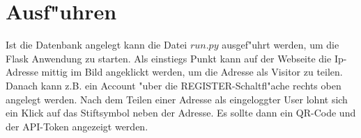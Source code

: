 \section{Ausf{"u}hren}\label{sec:ausfuhren}
Ist die Datenbank angelegt kann die Datei $run.py$ ausgef{"u}hrt werden, um die Flask Anwendung zu starten.
Als einstiegs Punkt kann auf der Webseite die Ip-Adresse mittig im Bild angeklickt werden, um die Adresse als Visitor zu teilen.
Danach kann z.B. ein Account {"u}ber die REGISTER-Schaltfl{"a}che rechts oben angelegt werden.
Nach dem Teilen einer Adresse als eingeloggter User lohnt sich ein Klick auf das Stiftsymbol neben der Adresse.
Es sollte dann ein QR-Code und der API-Token angezeigt werden.

